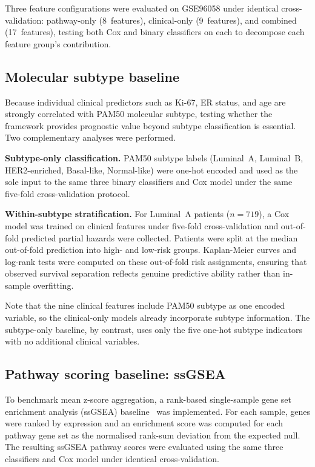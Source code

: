 \documentclass[review,12pt]{elsarticle}
\begin{document}
Three feature configurations were evaluated on GSE96058 under identical
cross-validation: pathway-only (8~features), clinical-only (9~features),
and combined (17~features), testing both Cox and binary classifiers on
each to decompose each feature group's contribution.

\subsection{Molecular subtype baseline}
\label{sec:subtypebaseline}

Because individual clinical predictors such as Ki-67, ER status, and age
are strongly correlated with PAM50 molecular subtype, testing whether
the framework provides prognostic value beyond subtype classification is
essential.  Two complementary analyses were performed.

\textbf{Subtype-only classification.}  PAM50 subtype labels (Luminal~A,
Luminal~B, HER2-enriched, Basal-like, Normal-like) were one-hot encoded
and used as the sole input to the same three binary classifiers and Cox
model under the same five-fold cross-validation protocol.

\textbf{Within-subtype stratification.}  For Luminal~A patients
(\(n = 719\)), a Cox model was trained on clinical features under
five-fold cross-validation and out-of-fold predicted partial hazards were
collected.  Patients were split at the median out-of-fold prediction
into high- and low-risk groups.  Kaplan-Meier curves and log-rank tests
were computed on these out-of-fold risk assignments, ensuring that
observed survival separation reflects genuine predictive ability rather
than in-sample overfitting.

Note that the nine clinical features include PAM50 subtype as one
encoded variable, so the clinical-only models already incorporate subtype
information.  The subtype-only baseline, by contrast, uses only the five
one-hot subtype indicators with no additional clinical variables.

\subsection{Pathway scoring baseline: ssGSEA}
\label{sec:ssgsea}

To benchmark mean z-score aggregation, a rank-based single-sample gene
set enrichment analysis (ssGSEA) baseline~\citep{barbie2009} was
implemented.  For each sample, genes were ranked by expression and an
enrichment score was computed for each pathway gene set as the normalised
rank-sum deviation from the expected null.  The resulting ssGSEA pathway
scores were evaluated using the same three classifiers and Cox model
under identical cross-validation.
\end{document}
